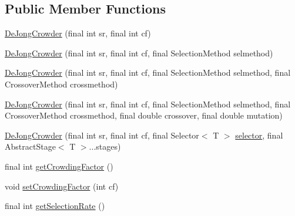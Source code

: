 \subsection*{Public Member Functions}
\begin{DoxyCompactItemize}
\item 
\hyperlink{classjenes_1_1stage_1_1operator_1_1common_1_1_de_jong_crowder_3_01_t_01extends_01_chromosome_01_4_a3a856be20539434c822eecf5fc099657}{De\-Jong\-Crowder} (final int sr, final int cf)
\item 
\hyperlink{classjenes_1_1stage_1_1operator_1_1common_1_1_de_jong_crowder_3_01_t_01extends_01_chromosome_01_4_a552f2f1d77a10c3ae9fb8c94924fb798}{De\-Jong\-Crowder} (final int sr, final int cf, final Selection\-Method selmethod)
\item 
\hyperlink{classjenes_1_1stage_1_1operator_1_1common_1_1_de_jong_crowder_3_01_t_01extends_01_chromosome_01_4_a50f143494ddff28214ac72497b0de52a}{De\-Jong\-Crowder} (final int sr, final int cf, final Selection\-Method selmethod, final Crossover\-Method crossmethod)
\item 
\hyperlink{classjenes_1_1stage_1_1operator_1_1common_1_1_de_jong_crowder_3_01_t_01extends_01_chromosome_01_4_a31f097247f16221e2074ddc05d198349}{De\-Jong\-Crowder} (final int sr, final int cf, final Selection\-Method selmethod, final Crossover\-Method crossmethod, final double crossover, final double mutation)
\item 
\hyperlink{classjenes_1_1stage_1_1operator_1_1common_1_1_de_jong_crowder_3_01_t_01extends_01_chromosome_01_4_a97d47f09a66cf05e1cfb7630410de686}{De\-Jong\-Crowder} (final int sr, final int cf, final Selector$<$ T $>$ \hyperlink{classjenes_1_1stage_1_1operator_1_1common_1_1_de_jong_crowder_3_01_t_01extends_01_chromosome_01_4_a6486b0225d345afd81b86dd04772d5ba}{selector}, final Abstract\-Stage$<$ T $>$...stages)
\item 
final int \hyperlink{classjenes_1_1stage_1_1operator_1_1common_1_1_de_jong_crowder_3_01_t_01extends_01_chromosome_01_4_af34ed99b72eedd09864a9c447179b04e}{get\-Crowding\-Factor} ()
\item 
void \hyperlink{classjenes_1_1stage_1_1operator_1_1common_1_1_de_jong_crowder_3_01_t_01extends_01_chromosome_01_4_a3420256f796449f9f486e6dc85c52f0d}{set\-Crowding\-Factor} (int cf)
\item 
final int \hyperlink{classjenes_1_1stage_1_1operator_1_1common_1_1_de_jong_crowder_3_01_t_01extends_01_chromosome_01_4_aeae8a98bdc6da2261e6071ca62c5a066}{get\-Selection\-Rate} ()
\item 

\end{DoxyCompactItemize}
